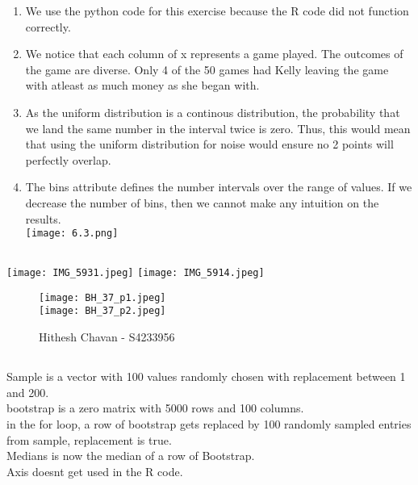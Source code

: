 \documentclass{article}
\begin{document}
\begin{enumerate}
    \item We use the python code for this exercise because the R code did not function correctly. \\
    \item We notice that each column of x represents a game played. The outcomes of the game are diverse. Only 4 of the 50 games had Kelly leaving the game with atleast as much money as she began with. \\
    \item As the uniform distribution is a continous distribution, the probability that we land the same number in the interval twice is zero. Thus, this would mean that using the uniform distribution for noise would ensure no 2 points will perfectly overlap. \\
    \item The bins attribute defines the number intervals over the range of values. If we decrease the number of bins, then we cannot make any intuition on the results. \\ \texttt{[image: 6.3.png]}
\end{enumerate}

\subsection{}
\texttt{[image: IMG\_5931.jpeg]} \newpage
\texttt{[image: IMG\_5914.jpeg]} 
\begin{figure}[H]
    \centering
    \texttt{[image: BH\_37\_p1.jpeg]}\\
    \texttt{[image: BH\_37\_p2.jpeg]}\\
    \caption{Hithesh Chavan - S4233956}
    \label{fig:my_label_2}
\end{figure}

\subsection{}
Sample is a vector with 100 values randomly chosen with replacement between 1 and 200.\\
bootstrap is a zero matrix with 5000 rows and 100 columns.\\
in the for loop, a row of bootstrap gets replaced by 100 randomly sampled entries from sample, replacement is true.\\
Medians is now the median of a row of Bootstrap.\\
Axis doesnt get used in the R code.
\end{document}
